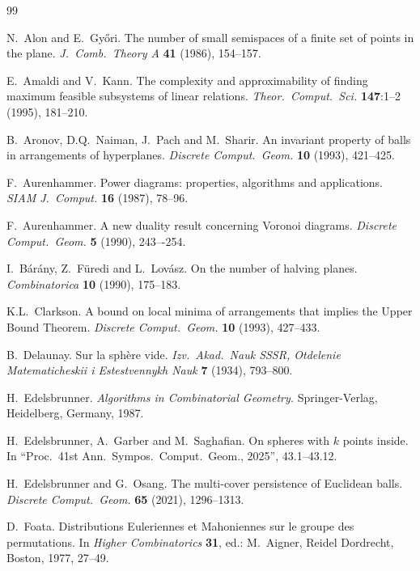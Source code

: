 \begin{thebibliography}{99}

{\sc N.\ Alon and E.\ Gy\H{o}ri.}
The number of small semispaces of a finite set of points in the plane.
\emph{J.\ Comb.\ Theory A} {\bf 41} (1986), 154--157.


{\sc E.\ Amaldi and V.\ Kann.}
The complexity and approximability of finding maximum feasible subsystems of linear relations.
\emph{Theor.\ Comput.\ Sci.} {\bf 147}:1--2 (1995), 181--210.


{\sc B.\ Aronov, D.Q.\ Naiman, J.\ Pach and M.\ Sharir.}
An invariant property of balls in arrangements of hyperplanes.
\emph{Discrete Comput.\ Geom.} {\bf 10} (1993), 421--425.

{\sc F.\ Aurenhammer.}
Power diagrams: properties, algorithms and applications.
\emph{SIAM J.\ Comput.} {\bf 16} (1987), 78--96.

{\sc F.\ Aurenhammer.}
A new duality result concerning Voronoi diagrams. 
\emph{Discrete Comput.\ Geom.} {\bf 5} (1990), 243–-254.

{\sc I.\ B\'ar\'any, Z.\ F\"uredi and L.\ Lov\'asz.}
On the number of halving planes. 
\emph{Combinatorica} {\bf 10} (1990), 175--183.

{\sc K.L.\ Clarkson.}
A bound on local minima of arrangements that implies the Upper Bound Theorem.
\emph{Discrete Comput.\ Geom.} {\bf 10} (1993), 427--433.

{\sc B.\ Delaunay.}
Sur la sph\`{e}re vide.
\emph{Izv.\ Akad.\ Nauk SSSR, Otdelenie Matematicheskii i Estestvennykh Nauk} {\bf 7} (1934), 793--800.

{\sc H.\ Edelsbrunner.}
\emph{Algorithms in Combinatorial Geometry.}
Springer-Verlag, Heidelberg, Germany, 1987.

{\sc H.\ Edelsbrunner, A.\ Garber and M.\ Saghafian.}
On spheres with $k$ points inside.
In ``Proc.\ 41st Ann.\ Sympos.\ Comput.\ Geom., 2025'', 43.1--43.12.

{\sc H.\ Edelsbrunner and G.\ Osang.}
The multi-cover persistence of Euclidean balls.
\emph{Discrete Comput.\ Geom.} {\bf 65} (2021), 1296--1313.

{\sc D.\ Foata.}
Distributions Euleriennes et Mahoniennes sur le groupe des permutations.
In \emph{Higher Combinatorics} {\bf 31}, ed.: M.\ Aigner, Reidel Dordrecht, Boston, 1977, 27--49.


\end{thebibliography}
